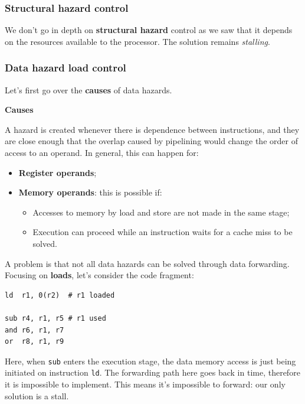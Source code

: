 \documentclass[a4paper,11pt]{article}
\begin{document}
\subsubsection{Structural hazard control}

We don't go in depth on \textbf{structural hazard} control as we saw that it depends on the resources available to the processor.
The solution remains \textit{stalling}.

\subsubsection{Data hazard load control}

Let's first go over the \textbf{causes} of data hazards.

\par\smallskip
\textbf{\textsf{Causes}}

A hazard is created whenever there is dependence between instructions, and they are close enough that the overlap caused by pipelining would change the order of access to an operand.
In general, this can happen for:
\begin{itemize}
	\item \textbf{Register operands};
	\item \textbf{Memory operands}: this is possible if:
	      \begin{itemize}
		      \item Accesses to memory by load and store are not made in the same stage;
		      \item Execution can proceed while an instruction waits for a cache miss to be solved.
	      \end{itemize}
\end{itemize}

A problem is that not all data hazards can be solved through data forwarding.
Focusing on \textbf{loads}, let's consider the code fragment:
\begin{lstlisting}[language=riscv, style=codestyle]	
ld  r1, 0(r2)  # r1 loaded 

sub r4, r1, r5 # r1 used
and r6, r1, r7
or  r8, r1, r9
\end{lstlisting}

Here, when \lstinline|sub| enters the execution stage, the data memory access is just being initiated on instruction \lstinline|ld|.
The forwarding path here goes back in time, therefore it is impossible to implement.
This means it's impossible to forward: our only solution is a stall.
\end{document}
